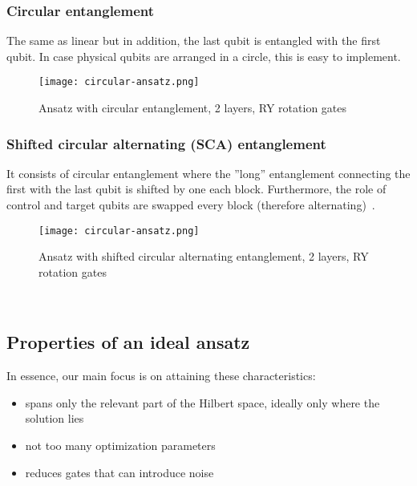 \subsubsection{Circular entanglement}
The same as linear but in addition, the last qubit is entangled with the first qubit. In case physical qubits are arranged in a circle, this is easy to implement.
\begin{figure}[H]
    \texttt{[image: circular-ansatz.png]}
    \caption{Ansatz with circular entanglement, 2 layers, RY rotation gates}
\end{figure}

\subsubsection{Shifted circular alternating (SCA) entanglement}
It consists of circular entanglement where the ''long'' entanglement connecting the first with the last qubit is shifted by one each block. Furthermore, the role of control and target qubits are swapped every block (therefore alternating)~\cite{twolocal}.
\begin{figure}[H]
    \texttt{[image: circular-ansatz.png]}
    \caption{Ansatz with shifted circular alternating entanglement, 2 layers, RY rotation gates}
\end{figure}

\\

\subsection{Properties of an ideal ansatz}
In essence, our main focus is on attaining these characteristics:
\begin{itemize}
    \item spans only the relevant part of the Hilbert space, ideally only where the solution lies
    \item not too many optimization parameters
    \item reduces gates that can introduce noise
\end{itemize}